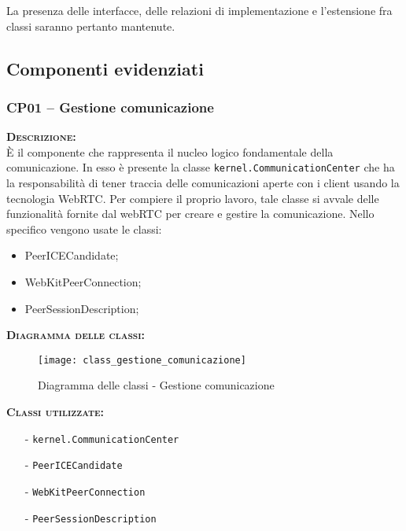 La presenza delle interfacce, delle relazioni di implementazione e l'estensione fra classi saranno pertanto mantenute.

\subsection{Componenti evidenziati}

\subsubsection{CP01 -- Gestione comunicazione}
\begin{description}
	\item{\scshape\bfseries Descrizione:}\\
È il componente che rappresenta il nucleo logico fondamentale della comunicazione. In esso è presente la classe \texttt{kernel.CommunicationCenter} che ha la responsabilità di tener traccia delle comunicazioni aperte con i client usando la tecnologia WebRTC\@. Per compiere il proprio lavoro, tale classe si avvale delle funzionalità fornite dal webRTC per creare e gestire la comunicazione. Nello specifico vengono usate le classi:

\begin{itemize}
	\item PeerICECandidate;
	\item WebKitPeerConnection;
	\item PeerSessionDescription;
\end{itemize}

	\item{\scshape\bfseries Diagramma delle classi:}
  \begin{figure}[H]
    \centering
    \texttt{[image: class\_gestione\_comunicazione]}
    \caption{Diagramma delle classi - Gestione comunicazione}\label{fig:gestionecomunicazione}
  \end{figure}

	\item{\scshape\bfseries Classi utilizzate:} 
	\begin{itemize}[noitemsep,nolistsep]
		\item[-] \texttt{kernel.CommunicationCenter}
		\item[-] \texttt{PeerICECandidate}
		\item[-] \texttt{WebKitPeerConnection}
		\item[-] \texttt{PeerSessionDescription}
	\end{itemize}  
\end{description}

